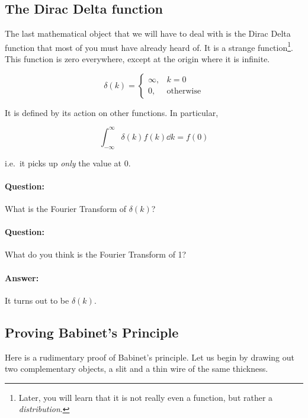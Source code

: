 \subsection{The Dirac Delta function}

The last mathematical object that we will have to deal with is the Dirac Delta function that most of you must have already heard of. It is a strange function\footnote{Later, you will learn that it is not really even a function, but rather a \textit{distribution}.}. This function is zero everywhere, except at the origin where it is infinite.

\begin{equation*}
\delta (k) = \begin{cases}
              \infty, & k = 0\\
               0,              & \text{otherwise}
             \end{cases}
\end{equation*}

It is defined by its action on other functions. In particular,

\begin{equation*}
\int_{-\infty}^\infty \delta(k) f(k) \dd k = f(0)
\end{equation*}

i.e.\ it picks up \textit{only} the value at 0.

\begin{tcolorbox}
\paragraph{Question: } What is the Fourier Transform of $\delta(k)$?

\paragraph{Question: } What do you think is the Fourier Transform of 1?
\paragraph{Answer: } It turns out to be $\delta(k)$.
\end{tcolorbox}


\subsection{Proving Babinet's Principle}

Here is a rudimentary proof of Babinet's principle. Let us begin by drawing out two complementary objects, a slit and a thin wire of the same thickness.

